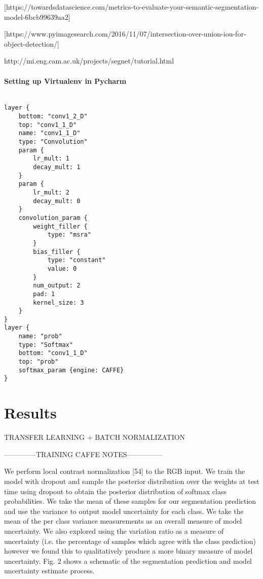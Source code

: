 [https://towardsdatascience.com/metrics-to-evaluate-your-semantic-segmentation-model-6bcb99639aa2]

[https://www.pyimagesearch.com/2016/11/07/intersection-over-union-iou-for-object-detection/]




http://mi.eng.cam.ac.uk/projects/segnet/tutorial.html

\subsubsection{Setting up Virtualenv in Pycharm}



\begin{lstlisting}

layer {
	bottom: "conv1_2_D"
	top: "conv1_1_D"
	name: "conv1_1_D"
	type: "Convolution"
	param {
		lr_mult: 1
		decay_mult: 1
	}
	param {
		lr_mult: 2
		decay_mult: 0
	}
	convolution_param {
		weight_filler {
			type: "msra"
		}
		bias_filler {
			type: "constant"
			value: 0
		}
		num_output: 2
		pad: 1
		kernel_size: 3
	}
}
layer {
	name: "prob"
	type: "Softmax"
	bottom: "conv1_1_D"
	top: "prob"
	softmax_param {engine: CAFFE}
}

\end{lstlisting}

\chapter{Results}

TRANSFER LEARNING + BATCH NORMALIZATION


\newpage
--------------TRAINING CAFFE NOTES---------------

We perform local contrast normalization [54] to the RGB input. 
We train the model with dropout and sample the posterior distribution over the weights at test time using dropout
to obtain the posterior distribution of softmax class probabilities. We take the mean of these samples for our segmentation prediction and use the variance to output model
uncertainty for each class. We take the mean of the per class
variance measurements as an overall measure of model uncertainty. We also explored using the variation ratio as
a measure of uncertainty (i.e. the percentage of samples
which agree with the class prediction) however we found
this to qualitatively produce a more binary measure of
model uncertainty. Fig. 2 shows a schematic of the segmentation prediction and model uncertainty estimate process.